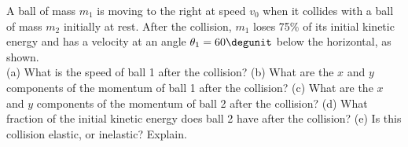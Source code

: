 A ball of mass $m_1$ is moving to the right at speed $v_0$ when it
collides with a ball of mass $m_2$ initially at rest. After the
collision, $m_1$ loses 75\% of its initial kinetic energy and has
a velocity at an angle $\theta_1 = 60\degunit$ below the
horizontal, as shown.\\
%
(a) What is the speed of ball 1 after the collision?\answercheck\hwendpart
%
(b) What are the $x$ and $y$ components of the momentum of ball 1
after the collision?\answercheck\hwendpart
%
(c) What are the $x$ and $y$ components of the momentum of ball 2
after the collision?\answercheck\hwendpart
%
(d) What fraction of the initial kinetic energy does ball 2 have
after the collision?\answercheck\hwendpart
%
(e) Is this collision elastic, or inelastic? Explain.
